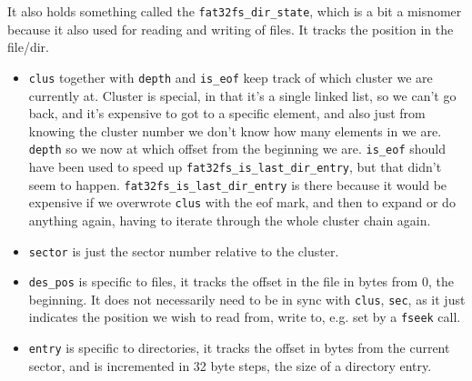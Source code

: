 It also holds something called the \verb|fat32fs_dir_state|, which is a bit a
misnomer because it also used for reading and writing of files.
It tracks the position in the file/dir.
\begin{itemize}
	\item \verb|clus| together with \verb|depth| and \verb|is_eof| keep track of
				which cluster we are currently at.
				Cluster is special, in that it's a single linked list, so we can't go
				back, and it's expensive to got to a specific element, and also just
				from knowing the cluster number we don't know how many elements in we
				are.
				\verb|depth| so we now at which offset from the beginning we are.
				\verb|is_eof| should have been used to speed up
				\verb|fat32fs_is_last_dir_entry|, but that didn't seem to happen.
				\verb|fat32fs_is_last_dir_entry| is there because it would be expensive
				if we overwrote \verb|clus| with the eof mark, and then to expand or do
				anything again, having to iterate through the whole cluster chain again.
	\item \verb|sector| is just the sector number relative to the cluster.
	\item \verb|des_pos| is specific to files, it tracks the offset in the file
				in bytes from 0, the beginning.
				It does not necessarily need to be in sync with \verb|clus|, \verb|sec|,
				as it just indicates the position we wish to read from, write to, e.g.
				set by a \verb|fseek| call.
	\item \verb|entry| is specific to directories, it tracks the offset in bytes
				from the current sector, and is incremented in 32 byte steps, the size
				of a directory entry.
\end{itemize}

